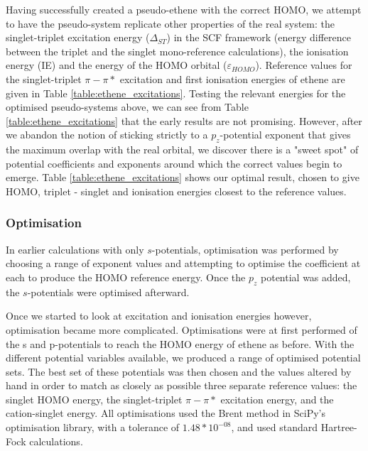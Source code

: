 \documentclass[aip]{revtex4-1}
\begin{document}
Having successfully created a pseudo-ethene with the correct HOMO, we attempt to have the pseudo-system replicate other properties of the real system:
the singlet-triplet excitation energy ($\Delta_{ST}$) in the SCF framework (energy difference between the triplet and the singlet mono-reference
calculations), the ionisation energy (IE) and the energy of the HOMO orbital ($\varepsilon_{HOMO}$). Reference values for the singlet-triplet \(\pi-\pi*\) excitation and first ionisation energies of ethene are given in Table \ref{table:ethene_excitations}. Testing the relevant energies for the optimised pseudo-systems above, we can see from Table \ref{table:ethene_excitations} that the early results are not promising. However, after we abandon the notion of sticking strictly to a \(p_{z}\)-potential exponent that gives the maximum overlap with the real orbital, we discover there is a "sweet spot" of potential coefficients and exponents around which the correct values begin to emerge. Table \ref{table:ethene_excitations} shows our optimal result, chosen to give HOMO, triplet - singlet and ionisation energies closest to the reference values. 

\subsubsection{Optimisation}

In earlier calculations with only \(s\)-potentials, optimisation was performed by choosing a range of exponent values and attempting to optimise the coefficient at each to produce the HOMO reference energy. Once the \(p_{z}\) potential was added, the \(s\)-potentials were optimised afterward. 

Once we started to look at excitation and ionisation energies however, optimisation became more complicated. Optimisations were at first performed of the s and p-potentials to reach the HOMO energy of ethene as before. With the different potential variables available, we produced a range of optimised potential sets. The best set of these potentials was then chosen and the values altered by hand in order to match as closely as possible three separate reference values: the singlet HOMO energy, the singlet-triplet \(\pi-\pi*\) excitation energy, and the cation-singlet energy. All optimisations used the Brent method in SciPy's optimisation library, with a tolerance of \(1.48*10^{-08}\), and used standard Hartree-Fock calculations.\cite{scipy}
\end{document}
